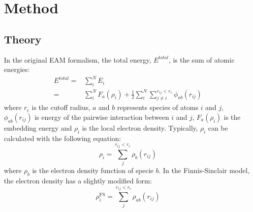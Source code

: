 \documentclass[prb,reprint]{revtex4-2}
\begin{document}
% 
%
\section{Method}
\label{sec:method}


\subsection{Theory}
\label{sec:theory}

In the original EAM formalism, the total energy, $E^{total}$, is the sum of 
atomic energies:
\begin{align}
E^{total} = & \sum_{i}^{N}{E_{i}} \nonumber \\
\label{eq:eam_total_energy}
= & \sum_{i}^{N}{F_{a}(\rho_i)} + 
    \frac{1}{2}\sum_{i}^{N}{\sum_{j \neq i}^{r_{ij} < r_c}{
    \phi_{ab}(r_{ij})
}}
\end{align}
where $r_c$ is the cutoff radius, $a$ and $b$ represents species of atoms $i$ 
and $j$, $\phi_{ab}(r_{ij})$ is energy of the pairwise interaction between $i$ 
and $j$, $F_{a}(\rho_{i})$ is the embedding energy and $\rho_{i}$ is the local 
electron density. Typically, $\rho_{i}$ can be calculated with the following 
equation:
\begin{equation}
\label{eq:rho_eam}
\rho_{i} = \sum_{j}^{r_{ij} < r_{c}}{
    \rho_{b}(r_{ij})
}
\end{equation}
where $\rho_{b}$ is the electron density function of specie $b$. In the 
Finnis-Sinclair model, the electron density has a slightly modified form:
\begin{equation}
\label{eq:rho_fs}
\rho_{i}^{\mathrm{FS}} = \sum_{j}^{r_{ij} < r_{c}}{
    \rho_{ab}(r_{ij})
}
\end{equation}
\end{document}
